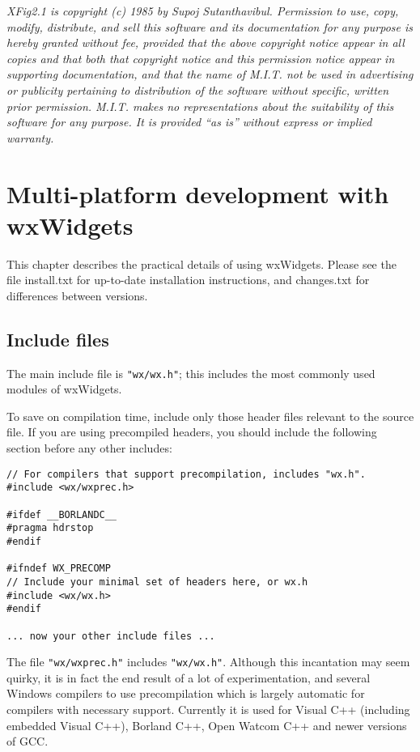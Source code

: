 {\it XFig2.1 is copyright (c) 1985 by Supoj Sutanthavibul. Permission to
use, copy, modify, distribute, and sell this software and its
documentation for any purpose is hereby granted without fee, provided
that the above copyright notice appear in all copies and that both that
copyright notice and this permission notice appear in supporting
documentation, and that the name of M.I.T. not be used in advertising or
publicity pertaining to distribution of the software without specific,
written prior permission.  M.I.T. makes no representations about the
suitability of this software for any purpose.  It is provided ``as is''
without express or implied warranty.}

\chapter{Multi-platform development with wxWidgets}\label{multiplat}
%
\setfooter{\thepage}{}{}{}{}{\thepage}%

This chapter describes the practical details of using wxWidgets. Please
see the file install.txt for up-to-date installation instructions, and
changes.txt for differences between versions.

\section{Include files}\label{includefiles}

The main include file is {\tt "wx/wx.h"}; this includes the most commonly
used modules of wxWidgets.

To save on compilation time, include only those header files relevant to the
source file. If you are using precompiled headers, you should include
the following section before any other includes:

\begin{verbatim}
// For compilers that support precompilation, includes "wx.h".
#include <wx/wxprec.h>

#ifdef __BORLANDC__
#pragma hdrstop
#endif

#ifndef WX_PRECOMP
// Include your minimal set of headers here, or wx.h
#include <wx/wx.h>
#endif

... now your other include files ...
\end{verbatim}

The file {\tt "wx/wxprec.h"} includes {\tt "wx/wx.h"}. Although this incantation
may seem quirky, it is in fact the end result of a lot of experimentation,
and several Windows compilers to use precompilation which is largely automatic for
compilers with necessary support. Currently it is used for Visual C++ (including 
embedded Visual C++), Borland C++, Open Watcom C++ and newer versions of GCC.

